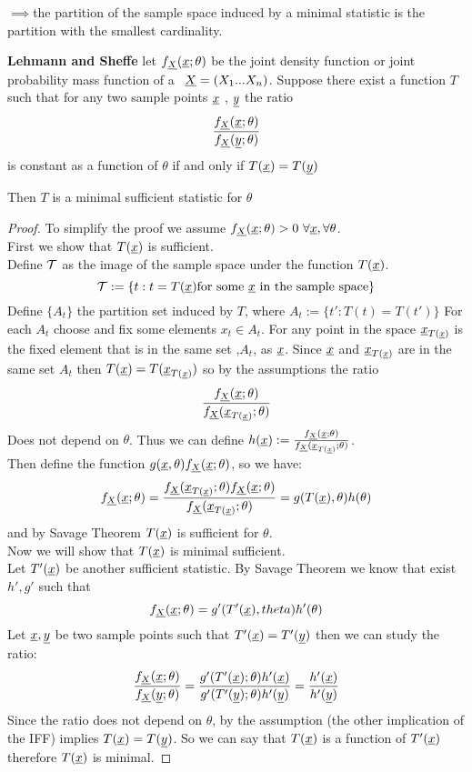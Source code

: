 $\implies$the partition of the sample space induced by a minimal statistic is the partition with the smallest cardinality.
\begin{teo}\textbf{Lehmann and Sheffe}
	let $f_{\underline X}(\underline{x};\theta)$ be the joint density function or joint probability mass function of a \rs \  $\underline X=(X_1...X_n)$. Suppose there exist a function $T$ such that for any two sample points $\underline x$ , $\underline y$ the ratio 
	\[
	\frac{f_{\underline X}(\underline{x};\theta)}{f_{\underline X}(\underline y;\theta)}
	\]
	is constant as a function of $\theta$ if and only if $T(\underline x)=T(\underline y)$
	
	
	Then $T$ is a minimal sufficient statistic for $\theta$ 
\end{teo}

\begin{proof}
	To simplify the proof we assume $f_{\underline X}(\underline{x};\theta) > 0 \ \forall \underline x, \forall \theta$.\\
	First we show that $T(\underline x)$ is sufficient.\\
	Define $\mathcal{T}$ as the image of the sample space under the function $T(\underline{x})$.
	$$\mathcal{T}:=\{ t:t=T(\underline{x}) \text{for some $\underline x$ in the sample space} \}$$
	Define $\{ A_t\} $ the partition set induced by $T$, where $A_t:=\{t' : T(t)=T(t') \}$ 
	For each $A_t$  choose and fix some elements $x_t\in A_t$. For any point in the space $\underline x_{T(\underline{x})}$ is the fixed element that is in the same set ,$A_t$, as $\underline x$. Since $\underline x$ and $\underline x_{T(\underline{x})}$ are in the same set $A_t$ then $T(\underline{x})=T(\underline x_{T(\underline{x})})$ so by the assumptions the ratio
	\[
	\frac{f_{\underline X}(\underline{x};\theta)}{f_{\underline X}(\underline x_{T(\underline{x})};\theta)}
	\]
Does not depend on $\theta$. Thus we can define $h(\underline x):=\frac{f_{\underline X}(\underline{x};\theta)}{f_{\underline X}(\underline x_{T(\underline{x})};\theta)}$.\\
Then define the function $g(\underline x,\theta)f_{\underline X}(\underline{x};\theta)$, so we have:
\[
f_{\underline X}(\underline{x};\theta) =\frac{f_{\underline X}(\underline x_{T(\underline{x})};\theta)f_{\underline X}(\underline{x};\theta)}{f_{\underline X}(\underline x_{T(\underline{x})};\theta)}=g(T(\underline x),\theta) h(\theta)
\]
and by Savage Theorem $T(\underline{x})$ is sufficient for $\theta$.\\


Now we will show that $T(\underline{x})$ is minimal sufficient.\\
Let  $T'(\underline x)$ be another sufficient statistic. By Savage Theorem we know that exist $h',g'$ such that
\[
f_{\underline X}(\underline{x};\theta)=g'(T'(\underline x),theta)h'(\theta)
\]
Let $\underline x,\underline y$ be two sample points such that $T'(\underline x)=T'(\underline y)$ then we can study the ratio:
\[
\frac{f_{\underline X}(\underline{x};\theta)}{f_{\underline X}(\underline y;\theta)}=\frac{g'(T'(\underline x);\theta)h'(\underline x)}{g'(T'(\underline y);\theta)h'(\underline y)}=\frac{h'(\underline x)}{h'(\underline y)}
\]
Since the ratio does not depend on $\theta$, by the assumption (the other implication of the IFF) implies $T(\underline{x}) =T(\underline y)$. So we can say that $T(\underline x)$ is a function of $T'(\underline x)$ therefore $T(\underline{x})$ is minimal.
\end{proof}
